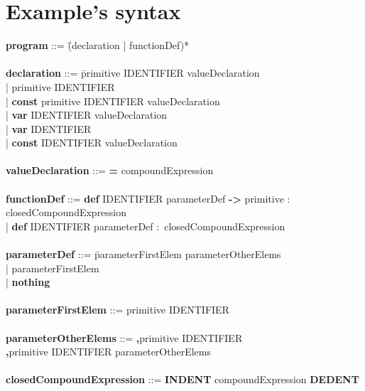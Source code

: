 \section{Example's syntax}
\begin{tabbing}

{\bf program}                     ::= \=(declaration | functionDef)*\\
\\
{\bf declaration}                 ::= \=primitive IDENTIFIER valueDeclaration\\
                                      \>| primitive IDENTIFIER\\
                                      \>| \textbf{const} primitive IDENTIFIER valueDeclaration\\
                                      \>| \textbf{var} IDENTIFIER valueDeclaration\\
                                      \>| \textbf{var} IDENTIFIER\\
                                      \>| \textbf{const} IDENTIFIER valueDeclaration\\
\\
{\bf valueDeclaration}            ::= \textbf{=} compoundExpression\\
\\
{\bf functionDef}                 ::= \= \textbf{def} IDENTIFIER parameterDef \textbf{->} primitive \textbf{$\colon$} closedCompoundExpression\\
                                      \>| \textbf{def} IDENTIFIER parameterDef \textbf{$\colon$} closedCompoundExpression\\
\\
{\bf parameterDef}                ::= \=parameterFirstElem parameterOtherElems\\
                                      \>| parameterFirstElem\\
                                      \>| \textbf{nothing}\\
\\
{\bf parameterFirstElem}          ::= primitive IDENTIFIER\\
\\
{\bf parameterOtherElems}         ::= \=\textbf{,}primitive IDENTIFIER\\
                                      \>\textbf{,}primitive IDENTIFIER parameterOtherElems\\  
\\
{\bf closedCompoundExpression}    ::= \textbf{INDENT} compoundExpression \textbf{DEDENT}\\

\end{tabbing}
